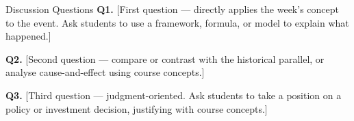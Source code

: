 \documentclass[aspectratio=169, 11pt]{beamer}
\begin{document}
\begin{frame}{Discussion Questions}
\textbf{Q1.} [First question --- directly applies the week's concept to the event.
Ask students to use a framework, formula, or model to explain what happened.]

\vspace{1em}
\textbf{Q2.} [Second question --- compare or contrast with the historical parallel,
or analyse cause-and-effect using course concepts.]

\vspace{1em}
\textbf{Q3.} [Third question --- judgment-oriented. Ask students to take a position
on a policy or investment decision, justifying with course concepts.]
\end{frame}
\end{document}
